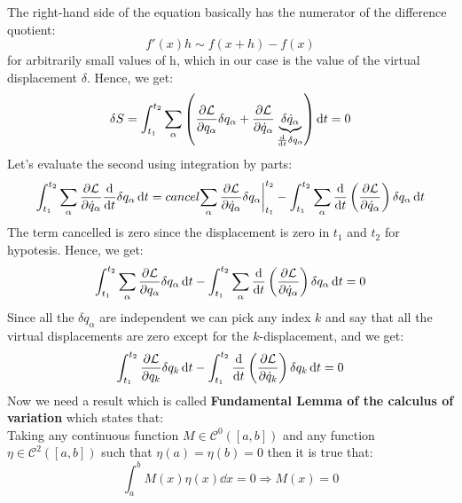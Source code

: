 The right-hand side of the equation basically has the numerator of the difference quotient:
\begin{equation}
    f'(x)h \sim f(x+h) - f(x)
\end{equation}
for arbitrarily small values of h, which in our case is the value of the virtual displacement $\delta$. Hence, we get:
\begin{equation}
    \delta S = \int_{t_1}^{t_2}\bigsum_{\alpha}\brackets{\pdv{\lagr}{q_{\alpha}}\delta q_{\alpha} + \pdv{\lagr}{\dot{q}_{\alpha}} \underbrace{\delta \dot{q}_{\alpha}}_{\frac{\dd{}}{\dd{t}}\delta q_{\alpha}}} \dd{t} = 0
\end{equation}
Let's evaluate the second using integration by parts:
\begin{equation}
    \int_{t_1}^{t_2}\bigsum_{\alpha}\pdv{\lagr}{\dot{q}_{\alpha}} \dv{}{t}\delta q_{\alpha} \dd{t} = \\cancel{\bigsum_{\alpha}\pdv{\lagr}{\dot{q}_{\alpha}} \delta q_{\alpha}\bigg|_{t_1}^{t_2}} - \int_{t_1}^{t_2}\bigsum_{\alpha}\dv{}{t}\brackets{\pdv{\lagr}{\dot{q}_{\alpha}}} \delta q_{\alpha} \dd{t}
\end{equation}
The term cancelled is zero since the displacement is zero in $t_1$ and $t_2$ for hypotesis. Hence, we get:
\begin{equation}
    \int_{t_1}^{t_2}\bigsum_{\alpha}\pdv{\lagr}{q_{\alpha}}\delta q_{\alpha} \dd{t} - \int_{t_1}^{t_2}\bigsum_{\alpha}\dv{}{t}\brackets{\pdv{\lagr}{\dot{q}_{\alpha}}} \delta q_{\alpha} \dd{t} = 0
\end{equation}
Since all the $\delta q_{\alpha}$ are independent we can pick any index $k$ and say that all the virtual displacements are zero except for the $k$-displacement, and we get:
\begin{equation}
    \int_{t_1}^{t_2}\dfrac{\partial \lagr}{\partial q_{k}}\delta q_{k} \dd{t} - \int_{t_1}^{t_2}\dv{}{t}\brackets{\dfrac{\partial \lagr}{\partial \dot{q}_{k}}} \delta q_{k} \dd{t} = 0
\end{equation}
Now we need a result which is called \textbf{Fundamental Lemma of the calculus of variation} which states that:\\
Taking any continuous function $M\in\mathcal{C}^0([a,b])$ and any function $\eta \in \mathcal{C}^2([a,b])$ such that $\eta(a) = \eta(b) = 0$ then it is true that:
\begin{equation} \label{e:Fundamental_lemma_variation_calculus}
    \int_{a}^{b}M(x)\eta(x)\dd{x} = 0 \Rightarrow M(x) = 0
\end{equation}
